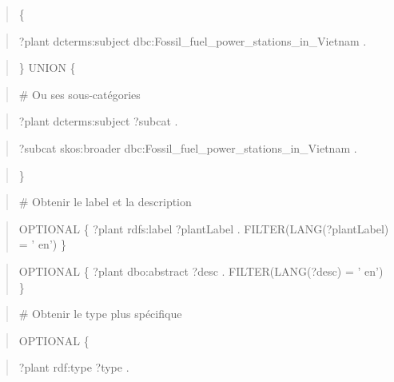 \documentclass[a4paper,11pt]{report}
\begin{document}
\begin{quote}
\{
\end{quote}

\begin{quote}
?plant dcterms:subject dbc:Fossil\_fuel\_power\_stations\_in\_Vietnam .
\end{quote}

\begin{quote}
\} UNION \{
\end{quote}

\begin{quote}
\# Ou ses sous-catégories
\end{quote}

\begin{quote}
?plant dcterms:subject ?subcat .
\end{quote}

\begin{quote}
?subcat skos:broader dbc:Fossil\_fuel\_power\_stations\_in\_Vietnam .
\end{quote}

\begin{quote}
\}
\end{quote}

\begin{quote}
\end{quote}

\begin{quote}
\# Obtenir le label et la description
\end{quote}

\begin{quote}
OPTIONAL \{ ?plant rdfs:label ?plantLabel . FILTER(LANG(?plantLabel) = ' en') \}
\end{quote}

\begin{quote}
OPTIONAL \{ ?plant dbo:abstract ?desc . FILTER(LANG(?desc) = ' en') \}
\end{quote}

\begin{quote}
\end{quote}

\begin{quote}
\# Obtenir le type plus spécifique
\end{quote}

\begin{quote}
OPTIONAL \{
\end{quote}

\begin{quote}
?plant rdf:type ?type .
\end{quote}
\end{document}
